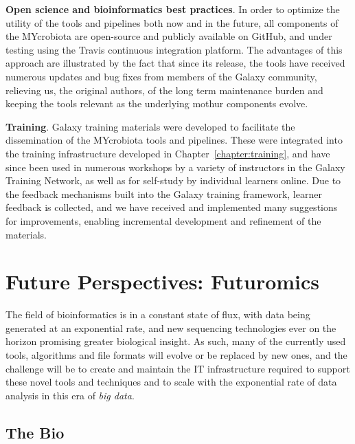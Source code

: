 \textbf{Open science and bioinformatics best practices}. In order to optimize the utility of the tools and pipelines both now and in the future, all components of the MYcrobiota are open-source and publicly available on GitHub, and under testing using the Travis continuous integration platform. The advantages of this approach are illustrated by the fact that since its release, the tools have received numerous updates and bug fixes from members of the Galaxy community, relieving us, the original authors, of the long term maintenance burden and keeping the tools relevant as the underlying mothur components evolve.

\textbf{Training}. Galaxy training materials were developed to facilitate the dissemination of the MYcrobiota tools and pipelines. These were integrated into the training infrastructure developed in Chapter~\ref{chapter:training}, and have since been used in numerous workshops by a variety of instructors in the Galaxy Training Network, as well as for self-study by individual learners online. Due to the feedback mechanisms built into the Galaxy training framework, learner feedback is collected, and we have received and implemented many suggestions for improvements, enabling incremental development and refinement of the materials.

\section{Future Perspectives: Futuromics}

The field of bioinformatics is in a constant state of flux, with data being generated at an exponential rate, and new sequencing technologies ever on the horizon promising greater biological insight. As such, many of the currently used tools, algorithms and file formats will evolve or be replaced by new ones, and the challenge will be to create and maintain the IT infrastructure required to support these novel tools and techniques and to scale with the exponential rate of data analysis in this era of \emph{big data}.

\subsection{The Bio}

